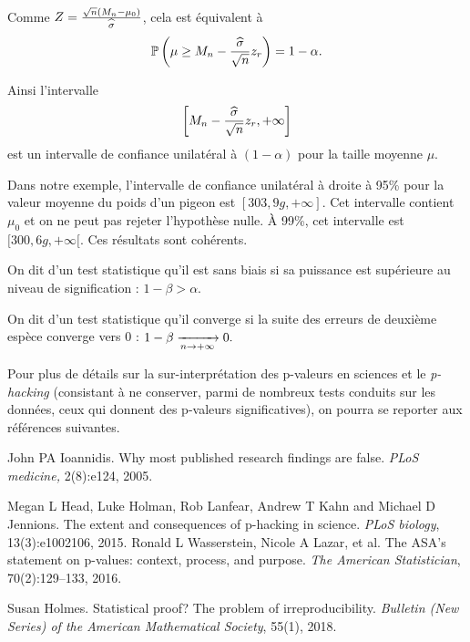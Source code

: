 Comme $Z = \frac{\sqrt{n} (M_n - \mu_0)}{{\widehat \sigma}}$, cela est équivalent à 
\[
  \mathbb{P} \left(\mu \geq M_n - \frac{{\widehat \sigma}}{\sqrt{n}} z_r \right) = 1 - \alpha.
\]

Ainsi l'intervalle 
\[
  \left[M_n - \frac{{\widehat \sigma}}{\sqrt{n}} z_r, +\infty \right]
\]
 est un intervalle de confiance unilatéral à $(1-\alpha)$ pour la taille moyenne $\mu$.

 Dans notre exemple, l'intervalle de confiance unilatéral à droite à 95\% pour
 la valeur moyenne du poids d'un pigeon est $[303,9\si{g}, +\infty]$. Cet
 intervalle contient $\mu_0$ et on ne peut pas rejeter l'hypothèse nulle.  À
 99\%, cet intervalle est $[300,6\si{g}, +\infty[.$ Ces résultats sont
 cohérents.

\begin{plusloin}
\item On dit d'un test statistique qu'il est sans biais si sa puissance est
  supérieure au niveau de signification : $1 - \beta > \alpha$.
\item On dit d'un test statistique qu'il converge si la suite des erreurs de
  deuxième espèce converge vers $0$ : $1 - \beta \xrightarrow[n \rightarrow +\infty]{} 0.$ 
\item Pour plus de détails sur la sur-interprétation des p-valeurs en sciences
  et le \textit{p-hacking} (consistant à ne conserver, parmi de nombreux tests
  conduits sur les données, ceux qui donnent des p-valeurs significatives), on
  pourra se reporter aux références suivantes.
  \begin{thebibliography}{99}
    John PA Ioannidis.
    {Why most published research findings are false.}
    \textit{PLoS medicine,} 
    2(8):{e124},
    {2005.}

    Megan L Head, Luke Holman, Rob Lanfear, Andrew T Kahn and Michael D Jennions.
    {The extent and consequences of p-hacking in science.}
    \textit{PLoS biology},
    13(3):{e1002106},
    {2015.}
    Ronald L Wasserstein, Nicole A Lazar, et al.
    {The ASA's statement on p-values: context, process, and purpose}.
    \textit{The American Statistician},
    70(2):129--133,
    2016.

    Susan Holmes.
    {Statistical proof? The problem of irreproducibility}.
    \textit{Bulletin (New Series) of the American Mathematical Society},
    {55}(1), 2018.
  \end{thebibliography}
\end{plusloin}





